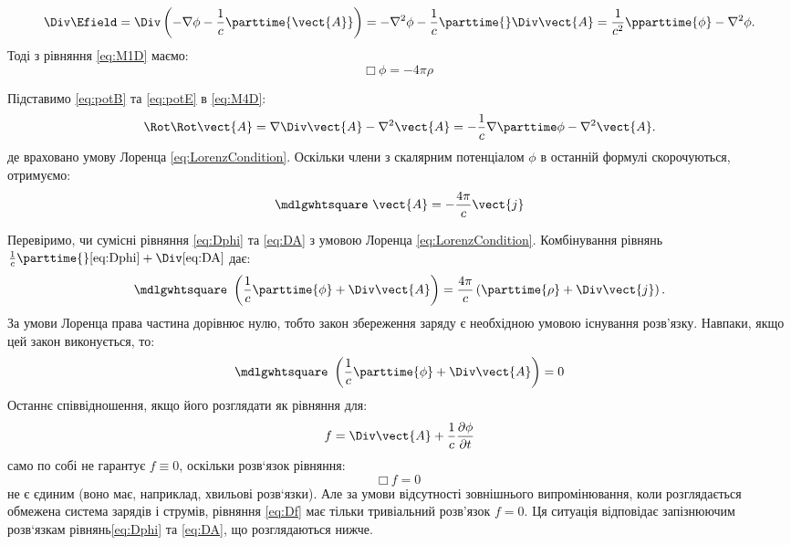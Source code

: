 \begin{equation*}
    \Div\Efield = \Div\left( -\nabla\phi - \frac1c \parttime{\vect{A}}\right) = - \nabla^2\phi - \frac1c \parttime{}\Div\vect{A} =
    \frac1{c^2}\pparttime{\phi} - \nabla^2\phi.
\end{equation*}
Тоді з рівняння \eqref{eq:M1D} маємо:
\begin{equation}\label{eq:Dphi}
	\mdlgwhtsquare\  \phi = -4\pi \rho
\end{equation}

Підставимо \eqref{eq:potB} та \eqref{eq:potE} в \eqref{eq:M4D}:
\begin{equation*}
    \Rot\Rot\vect{A} = \nabla \Div\vect{A} - \nabla^2\vect{A} = -\frac1c \nabla \parttime\phi - \nabla^2\vect{A}.
\end{equation*}
де враховано умову Лоренца \eqref{eq:LorenzCondition}. Оскільки члени з скалярним потенціалом
$\phi$ в останній формулі скорочуються, отримуємо:
\begin{equation}\label{eq:DA}
	\mdlgwhtsquare\  \vect{A} = -\frac{4\pi}{c} \vect{j}
\end{equation}

Перевіримо, чи сумісні рівняння \eqref{eq:Dphi} та \eqref{eq:DA} з умовою Лоренца \eqref{eq:LorenzCondition}.
Комбінування рівнянь $\frac1c \parttime{} \eqref{eq:Dphi} + \Div\eqref{eq:DA}$ дає:
\begin{equation}
	\mdlgwhtsquare\ \left( \frac1c \parttime{\phi} + \Div\vect{A} \right) = \frac{4\pi}c \left( \parttime{\rho} + \Div\vect{j}\right)  .
\end{equation}
За умови Лоренца права частина дорівнює нулю, тобто закон збереження
заряду є необхідною умовою існування розв’язку. Навпаки, якщо цей закон
виконується, то:
\begin{equation*}
	\mdlgwhtsquare\ \left( \frac1c \parttime{\phi} + \Div\vect{A} \right) = 0
\end{equation*}
Останнє співвідношення, якщо його розглядати як рівняння для:
\begin{equation}
	f = \Div \vect{A} + \frac{1}{c} \frac{\partial \phi}{\partial t}
\end{equation}
само по собі не гарантує $f \equiv 0$, оскільки розв`язок
рівняння:
\begin{equation}\label{eq:Df}
	\mdlgwhtsquare\ f = 0
\end{equation}
не є єдиним (воно має, наприклад, хвильові розв`язки). Але за умови
відсутності зовнішнього випромінювання, коли розглядається обмежена
система зарядів і струмів, рівняння \eqref{eq:Df} має тільки тривіальний розв'язок
$f=0$. Ця ситуація відповідає запізнюючим розв`язкам рівнянь\eqref{eq:Dphi} та \eqref{eq:DA}, що
розглядаються нижче.


